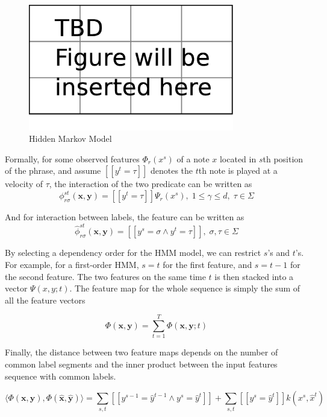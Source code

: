    \begin{figure}[tp]
      \begin{center}
         \includegraphics[width=0.8\textwidth]{fig/TBDFigure}
      \end{center}
      \caption{Hidden Markov Model}
      \label{fig:hmm}
   \end{figure}

Formally, for some observed features $\Phi_r(x^s)$ of a note $x$ located in $s$th position of the phrase, and assume $\left[ \left[ y^t = \tau \right] \right]$ denotes the $t$th note is played at a velocity of $\tau$, the interaction of the two predicate can be written as 
$$\phi^{st}_{r\sigma}(\mathbf{x}, \mathbf{y}) = \left[\left[y^t = \tau \right] \right]\Psi_r(x^s),\; 1\leq\gamma\leq d,\; \tau \in \Sigma $$

And for interaction between labels, the feature can be written as
$$\hat{\phi}^{st}_{r\sigma}(\mathbf{x}, \mathbf{y}) = \left[\left[y^s = \sigma \wedge y^t = \tau \right] \right],\; \sigma, \tau \in \Sigma $$

By selecting a dependency order for the HMM model, we can restrict $s$'s and $t$'s. For example, for a first-order HMM, $s = t$ for the first feature, and $s = t-1$ for the second feature. The two features on the same time $t$ is then stacked into a vector $\Psi(x,y;t)$. The feature map for the whole sequence is simply the sum of all the feature vectors 

$$\Phi(\mathbf{x}, \mathbf{y}) = \sum^T_{t=1}\Phi(\mathbf{x}, \mathbf{y};t)$$

Finally, the distance between two feature maps depends on the number of common label segments and the inner product between the input features sequence with common labels.


$$\langle\Phi(\mathbf{x}, \mathbf{y}), \Phi(\mathbf{\hat{x}}, \mathbf{\hat{y}})\rangle = \sum_{s,t}\left[\left[y^{s-1} = \hat{y}^{t-1}\wedge y^s = \hat{y}^t\right] \right] + \sum_{s,t}\left[\left[y^{s} = \hat{y}^{t}\right] \right]k(x^s, \hat{x}^t)$$


